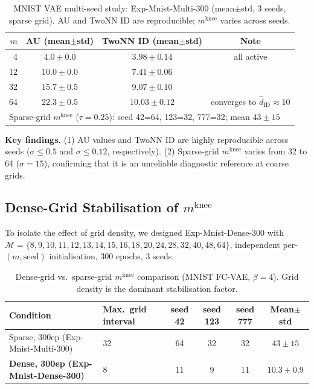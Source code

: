 \documentclass[11pt,a4paper]{article}
\newcommand{\mknee}{m^{\mathrm{knee}}}
\newcommand{\hatdID}{\hat{d}_{\mathrm{ID}}}
\begin{document}
\begin{table}[ht]
\centering
\caption{MNIST VAE multi-seed study: Exp-Mnist-Multi-300 (mean$\pm$std, 3 seeds, sparse grid).
AU and TwoNN ID are reproducible; $\mknee$ varies across seeds.}
\label{tab:multiseed_300}
\small
\begin{tabular}{rccc}
\toprule
$m$ & AU (mean$\pm$std) & TwoNN ID (mean$\pm$std) & Note \\
\midrule
4  & $4.0\pm0.0$ & $3.98\pm0.14$ & all active \\
12 & $10.0\pm0.0$ & $7.41\pm0.06$ & \\
32 & $15.7\pm0.5$ & $9.07\pm0.10$ & \\
64 & $22.3\pm0.5$ & $\mathbf{10.03\pm0.12}$ & converges to $\hatdID\approx10$ \\
\midrule
\multicolumn{4}{l}{Sparse-grid $\mknee$ ($\tau=0.25$):
seed 42=64, 123=32, 777=32; mean $43\pm15$} \\
\bottomrule
\end{tabular}
\end{table}

\textbf{Key findings.}
(1) AU values and TwoNN ID are highly reproducible across seeds
($\sigma\leq0.5$ and $\sigma\leq0.12$, respectively).
(2) Sparse-grid $\mknee$ varies from 32 to 64 ($\sigma=15$), confirming that
it is an unreliable diagnostic reference at coarse grids.

\subsection{Dense-Grid Stabilisation of $\mknee$}\label{sec:exp_dense}

To isolate the effect of grid density, we designed
Exp-Mnist-Dense-300 with
$\mathcal{M}=\{8,9,10,11,12,13,14,15,16,18,20,24,28,32,40,48,64\}$,
independent per-$(m,\text{seed})$ initialisation, 300 epochs, 3 seeds.

\begin{table}[ht]
\centering
\caption{Dense-grid vs.\ sparse-grid $\mknee$ comparison (MNIST FC-VAE, $\beta=4$).
Grid density is the dominant stabilisation factor.}
\label{tab:el_mknee}
\small
\begin{tabularx}{\linewidth}{lXcccc}
\toprule
Condition & Max.\ grid interval & seed 42 & seed 123 & seed 777 & Mean$\pm$std \\
\midrule
Sparse, 300ep (Exp-Mnist-Multi-300) & 32 & 64 & 32 & 32 & $43\pm15$ \\
\textbf{Dense, 300ep (Exp-Mnist-Dense-300)} & 8 & 11 & 9 & 11 & $\boldsymbol{10.3\pm0.9}$ \\
\bottomrule
\end{tabularx}
\end{table}
\end{document}
